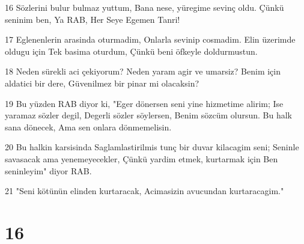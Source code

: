 \par 16 Sözlerini bulur bulmaz yuttum, Bana nese, yüregime sevinç oldu. Çünkü seninim ben, Ya RAB, Her Seye Egemen Tanri!
\par 17 Eglenenlerin arasinda oturmadim, Onlarla sevinip cosmadim. Elin üzerimde oldugu için Tek basima oturdum, Çünkü beni öfkeyle doldurmustun.
\par 18 Neden sürekli aci çekiyorum? Neden yaram agir ve umarsiz? Benim için aldatici bir dere, Güvenilmez bir pinar mi olacaksin?
\par 19 Bu yüzden RAB diyor ki, "Eger dönersen seni yine hizmetime alirim; Ise yaramaz sözler degil, Degerli sözler söylersen, Benim sözcüm olursun. Bu halk sana dönecek, Ama sen onlara dönmemelisin.
\par 20 Bu halkin karsisinda Saglamlastirilmis tunç bir duvar kilacagim seni; Seninle savasacak ama yenemeyecekler, Çünkü yardim etmek, kurtarmak için Ben seninleyim" diyor RAB.
\par 21 "Seni kötünün elinden kurtaracak, Acimasizin avucundan kurtaracagim."

\chapter{16}

